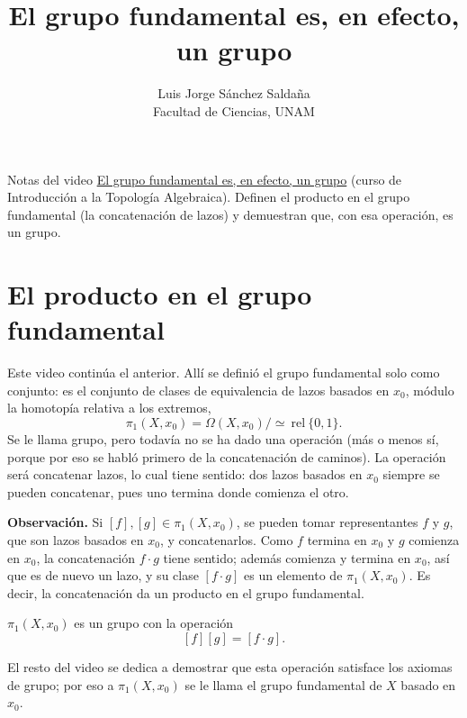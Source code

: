 \documentclass[11pt]{article}
\title{El grupo fundamental es, en efecto, un grupo}
\author{Luis Jorge Sánchez Saldaña\\[2pt]\small Facultad de Ciencias, UNAM}
\date{}
\begin{document}
\maketitle

\noindent\small Notas del video
\href{https://www.youtube.com/watch?v=q9YDDtvI7fI}{\guillemotleft{}El grupo fundamental es, en efecto, un grupo\guillemotright{}}
(curso de Introducción a la Topología Algebraica). Definen el producto en el grupo fundamental (la concatenación de lazos) y demuestran que, con esa operación, es un grupo.
\normalsize

\section*{El producto en el grupo fundamental}

Este video continúa el anterior. Allí se definió el grupo fundamental solo como conjunto: es el conjunto de clases de equivalencia de lazos basados en $x_0$, módulo la homotopía relativa a los extremos,
\[
  \pi_1(X,x_0)=\Omega(X,x_0)\big/\!\simeq\ \mathrm{rel}\ \{0,1\}.
\]
Se le llama \guillemotleft{}grupo\guillemotright{}, pero todavía no se ha dado una operación (más o menos sí, porque por eso se habló primero de la concatenación de caminos). La operación será concatenar lazos, lo cual tiene sentido: dos lazos basados en $x_0$ siempre se pueden concatenar, pues uno termina donde comienza el otro.

\medskip\noindent\textbf{Observación.} Si $[f],[g]\in\pi_1(X,x_0)$, se pueden tomar representantes $f$ y $g$, que son lazos basados en $x_0$, y concatenarlos. Como $f$ termina en $x_0$ y $g$ comienza en $x_0$, la concatenación $f\cdot g$ tiene sentido; además comienza y termina en $x_0$, así que es de nuevo un lazo, y su clase $[f\cdot g]$ es un elemento de $\pi_1(X,x_0)$. Es decir, la concatenación da un producto en el grupo fundamental.

\begin{teo}
$\pi_1(X,x_0)$ es un grupo con la operación
\[
  [f][g]=[f\cdot g].
\]
\end{teo}

El resto del video se dedica a demostrar que esta operación satisface los axiomas de grupo; por eso a $\pi_1(X,x_0)$ se le llama el grupo fundamental de $X$ basado en $x_0$.
\end{document}
